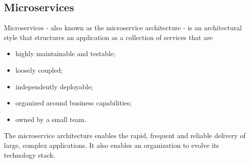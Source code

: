 
\subsection*{Microservices}
Microservices - also known as the microservice architecture - is an architectural style that structures an application as a collection of services that are
\begin{itemize}
    \item highly maintainable and testable;
    \item loosely coupled;
    \item independently deployable;
    \item organized around business capabilities;
    \item owned by a small team.
\end{itemize}
The microservice architecture enables the rapid, frequent and reliable delivery of large, complex applications. It also enables an organization to evolve its technology stack. 
